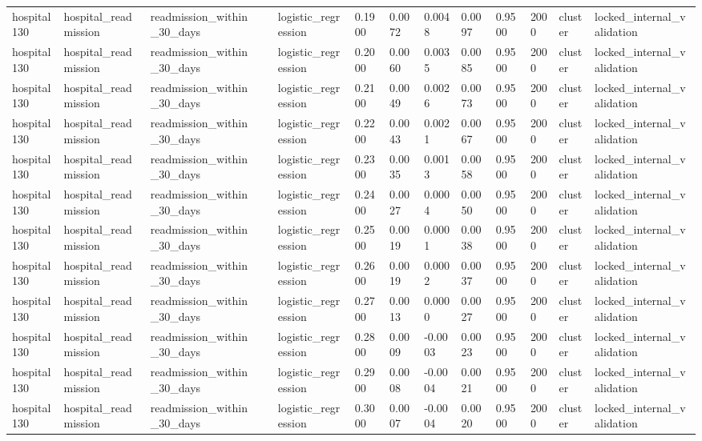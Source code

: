 \begin{tabular}{lllllllllllll}
hospital130 & hospital\_readmission & readmission\_within\_30\_days &  & logistic\_regression & 0.1900 & 0.0072 & 0.0048 & 0.0097 & 0.9500 & 2000 & cluster & locked\_internal\_validation \\
hospital130 & hospital\_readmission & readmission\_within\_30\_days &  & logistic\_regression & 0.2000 & 0.0060 & 0.0035 & 0.0085 & 0.9500 & 2000 & cluster & locked\_internal\_validation \\
hospital130 & hospital\_readmission & readmission\_within\_30\_days &  & logistic\_regression & 0.2100 & 0.0049 & 0.0026 & 0.0073 & 0.9500 & 2000 & cluster & locked\_internal\_validation \\
hospital130 & hospital\_readmission & readmission\_within\_30\_days &  & logistic\_regression & 0.2200 & 0.0043 & 0.0021 & 0.0067 & 0.9500 & 2000 & cluster & locked\_internal\_validation \\
hospital130 & hospital\_readmission & readmission\_within\_30\_days &  & logistic\_regression & 0.2300 & 0.0035 & 0.0013 & 0.0058 & 0.9500 & 2000 & cluster & locked\_internal\_validation \\
hospital130 & hospital\_readmission & readmission\_within\_30\_days &  & logistic\_regression & 0.2400 & 0.0027 & 0.0004 & 0.0050 & 0.9500 & 2000 & cluster & locked\_internal\_validation \\
hospital130 & hospital\_readmission & readmission\_within\_30\_days &  & logistic\_regression & 0.2500 & 0.0019 & 0.0001 & 0.0038 & 0.9500 & 2000 & cluster & locked\_internal\_validation \\
hospital130 & hospital\_readmission & readmission\_within\_30\_days &  & logistic\_regression & 0.2600 & 0.0019 & 0.0002 & 0.0037 & 0.9500 & 2000 & cluster & locked\_internal\_validation \\
hospital130 & hospital\_readmission & readmission\_within\_30\_days &  & logistic\_regression & 0.2700 & 0.0013 & 0.0000 & 0.0027 & 0.9500 & 2000 & cluster & locked\_internal\_validation \\
hospital130 & hospital\_readmission & readmission\_within\_30\_days &  & logistic\_regression & 0.2800 & 0.0009 & -0.0003 & 0.0023 & 0.9500 & 2000 & cluster & locked\_internal\_validation \\
hospital130 & hospital\_readmission & readmission\_within\_30\_days &  & logistic\_regression & 0.2900 & 0.0008 & -0.0004 & 0.0021 & 0.9500 & 2000 & cluster & locked\_internal\_validation \\
hospital130 & hospital\_readmission & readmission\_within\_30\_days &  & logistic\_regression & 0.3000 & 0.0007 & -0.0004 & 0.0020 & 0.9500 & 2000 & cluster & locked\_internal\_validation \\

\end{tabular}
